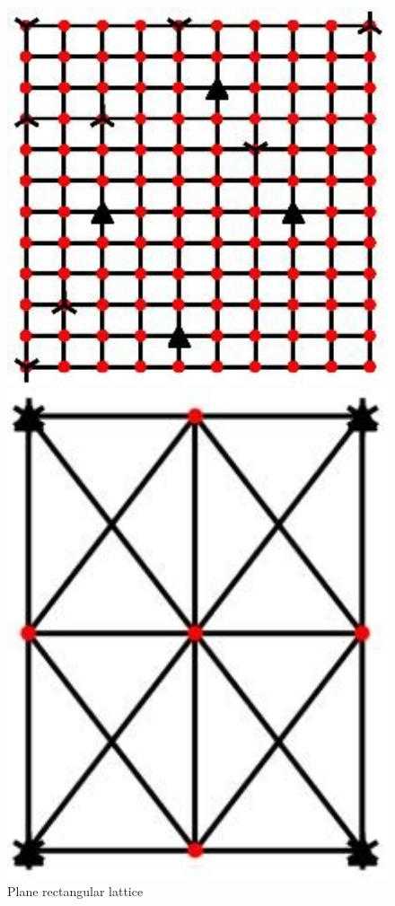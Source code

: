 \begin{figure}[htbp]
\begin{minipage}{0.3\textwidth}
    \centering
    \includegraphics[width = 1\textwidth]{Figures/10x12simple_plane.jpg}
    \caption{Plane rectangular lattice}
    \label{fig:plane_rectangular}
\end{minipage}
\hspace{5mm}
\begin{minipage}{0.3\textwidth}
    \centering
    \includegraphics[width = 1\textwidth]{Figures/3x3braced_plane.jpg}

\end{minipage}
\end{figure}
